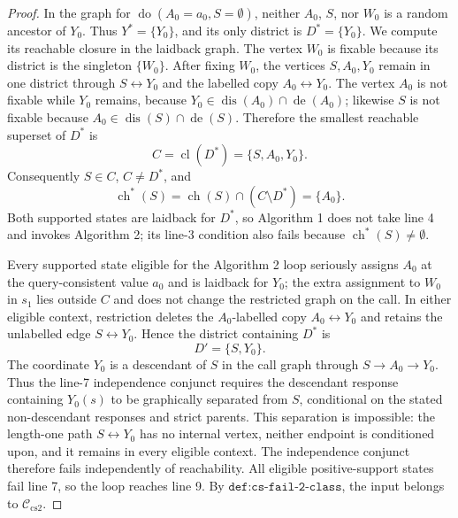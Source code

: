 \documentclass{article}
\begin{document}
\begin{proof}
In the graph for \(\operatorname{do}(A_0=a_0,S=\emptyset)\), neither \(A_0\), \(S\), nor \(W_0\) is a random ancestor of \(Y_0\). Thus \(Y^\ast=\{Y_0\}\), and its only district is \(D^\ast=\{Y_0\}\). We compute its reachable closure in the laidback graph. The vertex \(W_0\) is fixable because its district is the singleton \(\{W_0\}\). After fixing \(W_0\), the vertices \(S,A_0,Y_0\) remain in one district through \(S\leftrightarrow Y_0\) and the labelled copy \(A_0\leftrightarrow Y_0\). The vertex \(A_0\) is not fixable while \(Y_0\) remains, because \(Y_0\in\operatorname{dis}(A_0)\cap\operatorname{de}(A_0)\); likewise \(S\) is not fixable because \(A_0\in\operatorname{dis}(S)\cap\operatorname{de}(S)\). Therefore the smallest reachable superset of \(D^\ast\) is
\[
C=\operatorname{cl}(D^\ast)=\{S,A_0,Y_0\}.
\]
Consequently \(S\in C\), \(C\ne D^\ast\), and
\[
\operatorname{ch}^\ast(S)=\operatorname{ch}(S)\cap(C\setminus D^\ast)=\{A_0\}.
\]
Both supported states are laidback for \(D^\ast\), so Algorithm 1 does not take line 4 and invokes Algorithm 2; its line-3 condition also fails because \(\operatorname{ch}^\ast(S)\ne\emptyset\).

Every supported state eligible for the Algorithm 2 loop seriously assigns \(A_0\) at the query-consistent value \(a_0\) and is laidback for \(Y_0\); the extra assignment to \(W_0\) in \(s_1\) lies outside \(C\) and does not change the restricted graph on the call. In either eligible context, restriction deletes the \(A_0\)-labelled copy \(A_0\leftrightarrow Y_0\) and retains the unlabelled edge \(S\leftrightarrow Y_0\). Hence the district containing \(D^\ast\) is
\[
D'=\{S,Y_0\}.
\]
The coordinate \(Y_0\) is a descendant of \(S\) in the call graph through \(S\to A_0\to Y_0\). Thus the line-7 independence conjunct requires the descendant response containing \(Y_0(s)\) to be graphically separated from \(S\), conditional on the stated non-descendant responses and strict parents. This separation is impossible: the length-one path \(S\leftrightarrow Y_0\) has no internal vertex, neither endpoint is conditioned upon, and it remains in every eligible context. The independence conjunct therefore fails independently of reachability. All eligible positive-support states fail line 7, so the loop reaches line 9. By \(\texttt{def:cs-fail-2-class}\), the input belongs to \(\mathcal C_{\mathrm{cs2}}\).
\end{proof}
\end{document}
